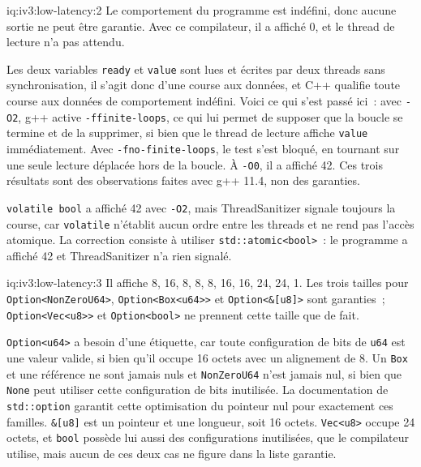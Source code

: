 \begin{solution}{iq:iv3:low-latency:2}
Le comportement du programme est indéfini, donc aucune sortie ne peut être garantie. Avec ce compilateur, il a affiché 0, et le thread de lecture n'a pas attendu.

Les deux variables \texttt{ready} et \texttt{value} sont lues et écrites par deux threads sans synchronisation, il s'agit donc d'une course aux données, et C++ qualifie toute course aux données de comportement indéfini. Voici ce qui s'est passé ici~: avec \texttt{-O2}, g++ active \texttt{-ffinite-loops}, ce qui lui permet de supposer que la boucle se termine et de la supprimer, si bien que le thread de lecture affiche \texttt{value} immédiatement. Avec \texttt{-fno-finite-loops}, le test s'est bloqué, en tournant sur une seule lecture déplacée hors de la boucle. À \texttt{-O0}, il a affiché 42. Ces trois résultats sont des observations faites avec g++ 11.4, non des garanties.

\texttt{volatile bool} a affiché 42 avec \texttt{-O2}, mais ThreadSanitizer signale toujours la course, car \texttt{volatile} n'établit aucun ordre entre les threads et ne rend pas l'accès atomique. La correction consiste à utiliser \texttt{std::atomic<bool>}~: le programme a affiché 42 et ThreadSanitizer n'a rien signalé.

\end{solution}

\begin{solution}{iq:iv3:low-latency:3}
Il affiche 8, 16, 8, 8, 8, 16, 16, 24, 24, 1. Les trois tailles pour \texttt{Option<NonZeroU64>}, \texttt{Option<Box<u64>{}>} et \texttt{Option<\&[u8]>} sont garanties~; \texttt{Option<Vec<u8>{}>} et \texttt{Option<bool>} ne prennent cette taille que de fait.

\texttt{Option<u64>} a besoin d'une étiquette, car toute configuration de bits de \texttt{u64} est une valeur valide, si bien qu'il occupe 16 octets avec un alignement de 8. Un \texttt{Box} et une référence ne sont jamais nuls et \texttt{NonZeroU64} n'est jamais nul, si bien que \texttt{None} peut utiliser cette configuration de bits inutilisée. La documentation de \texttt{std::option} garantit cette optimisation du pointeur nul pour exactement ces familles. \texttt{\&[u8]} est un pointeur et une longueur, soit 16 octets. \texttt{Vec<u8>} occupe 24 octets, et \texttt{bool} possède lui aussi des configurations inutilisées, que le compilateur utilise, mais aucun de ces deux cas ne figure dans la liste garantie.

\end{solution}

